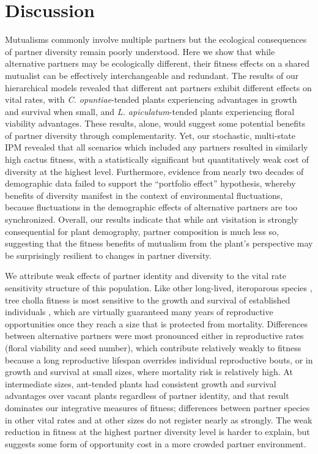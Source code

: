\documentclass[11pt]{article}
\begin{document}
\section*{Discussion}
Mutualisms commonly involve multiple partners but the ecological consequences of partner diversity remain poorly understood. 
Here we show that while alternative partners may be ecologically different, their fitness effects on a shared mutualist can be effectively interchangeable and redundant.
The results of our hierarchical models revealed that different ant partners exhibit different effects on vital rates, with \textit{C. opuntiae}-tended plants experiencing advantages in growth and survival when small, and \textit{L. apiculatum}-tended plants experiencing floral viability advantages. 
These results, alone, would suggest some potential benefits of partner diversity through complementarity.  
Yet, our stochastic, multi-state IPM revealed that all scenarios which included any partners resulted in similarly high cactus fitness, with a statistically significant but quantitatively weak cost of diversity at the highest level. 
Furthermore, evidence from nearly two decades of demographic data failed to support the ``portfolio effect'' hypothesis, whereby benefits of diversity manifest in the context of environmental fluctuations, because fluctuations in the demographic effects of alternative partners are too synchronized. 
Overall, our results indicate that while ant visitation is strongly consequential for plant demography, partner composition is much less so, suggesting that the fitness benefits of mutualism from the plant's perspective may be surprisingly resilient to changes in partner diversity. 

We attribute weak effects of partner identity and diversity to the vital rate sensitivity structure of this population. 
Like other long-lived, iteroparous species \citep{Franco2004}, tree cholla fitness is most sensitive to the growth and survival of established individuals \citep{Miller2009,elderd2016quantifying}, which are virtually guaranteed many years of reproductive opportunities once they reach a size that is protected from mortality. 
Differences between alternative partners were most pronounced either in reproductive rates (floral viability and seed number), which contribute relatively weakly to fitness because a long reproductive lifespan overrides individual reproductive bouts, or in growth and survival at small sizes, where mortality risk is relatively high. 
At intermediate sizes, ant-tended plants had consistent growth and survival advantages over vacant plants regardless of partner identity, and that result dominates our integrative measures of fitness; differences between partner species in other vital rates and at other sizes do not register nearly as strongly. 
The weak reduction in fitness at the highest partner diversity level is harder to explain, but suggests some form of opportunity cost in a more crowded partner environment. 
\end{document}
